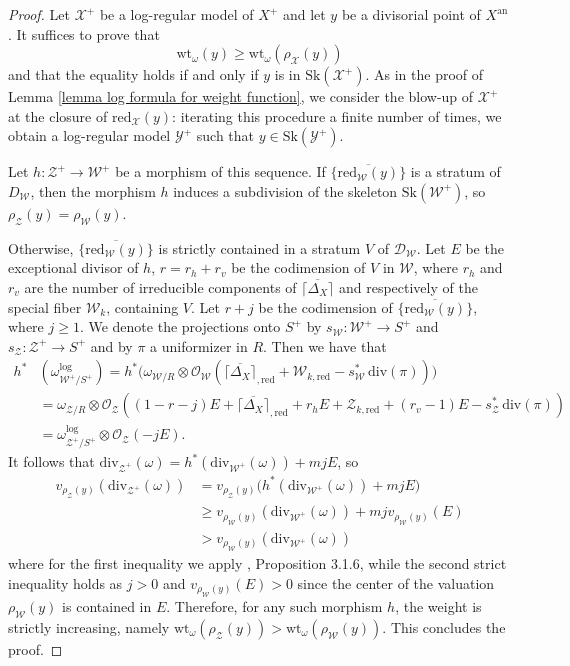 \documentclass{amsart}%
\numberwithin{equation}{subsection}
\theoremstyle{plain2}
\theoremstyle{definition2}
\theoremstyle{stepstyle}
\theoremstyle{point}
\theoremstyle{subpoint}
\newcommand{\D}{{\mathcal D}}
\newcommand{\cX}{\ensuremath{\mathscr{X}}}
\newcommand{\caO}{\ensuremath{\mathcal{O}}}
\newcommand{\cY}{\ensuremath{\mathscr{Y}}}
\newcommand{\cZ}{\ensuremath{\mathscr{Z}}}
\newcommand{\cW}{\ensuremath{\mathscr{W}}}
\renewcommand{\cY}{\ensuremath{\mathscr{Y}}}
\newcommand{\redu}{\mathrm{red}}
\newcommand{\an}{\mathrm{an}}
\newcommand{\divisor}{\mathrm{div}}
\newcommand{\weight}{\mathrm{wt}}
\newcommand{\Sk}{\mathrm{Sk}}
\begin{document}
\begin{proof}
Let $\cX^+$ be a log-regular model of $X^+$ and let $y$ be a divisorial point of $X^\an$. It suffices to prove that $$\weight_{\omega}(y) \geqslant \weight_{\omega}(\rho_\cX(y))$$ and that the equality holds if and only if $y$ is in $\Sk(\cX^+)$. As in the proof of Lemma \ref{lemma log formula for weight function}, we consider the blow-up of $\cX^+$ at the closure of $\redu_{\cX}(y)$: iterating this procedure a finite number of times, we obtain a log-regular model $\cY^+$ such that $y \in \Sk(\cY^+)$.

Let $h: \cZ^+ \rightarrow \cW^+$ be a morphism of this sequence. If $\overline{ \{\redu_{\cW}(y)\}}$ is a stratum of $D_\cW$, then the morphism $h$ induces a subdivision of the skeleton $\Sk(\cW^+)$, so $\rho_\cZ(y)= \rho_{\cW}(y)$.

Otherwise, $\overline{ \{\redu_{\cW}(y)\}}$ is strictly contained in a stratum $V$ of $\D_\cW$. Let $E$ be the exceptional divisor of $h$, $r=r_h +r_v$ be the codimension of $V$ in $\cW$, where $r_h$ and $r_v$ are the number of irreducible components of $\overline{\lceil\Delta_X \rceil}$ and respectively of the special fiber $\cW_k$, containing $V$. Let $r+j$ be the codimension of $\overline{ \{\redu_{\cW}(y)\}}$, where $j \geqslant 1$. We denote the projections onto $S^+$ by $s_{\cW}:\cW^+\rightarrow S^+$ and $s_{\cZ}:\cZ^+ \rightarrow S^+$ and by $\pi$ a uniformizer in $R$. Then we have that
\begin{align*}
h^*&(\omega^{\log}_{\cW^+/S^+}) = h^* \big(\omega_{\cW/R} \otimes \caO_{\cW}(\overline{\lceil\Delta_X \rceil}_{,\redu} + \cW_{k,\redu} - s_\cW^*\, \divisor(\pi)) \big) \\
& = \omega_{\cZ/R}\otimes \caO_{\cZ}((1-r-j)E +\overline{\lceil\Delta_X \rceil}_{,\redu} + r_hE+ \cZ_{k,\redu} + (r_v-1)E - s_\cZ^*\,\divisor(\pi))\\
& = \omega^{\log}_{\cZ^+/S^+} \otimes \caO_{\cZ}(-j E).
\end{align*} It follows that $\divisor_{\cZ^+}(\omega)= h^*(\divisor_{\cW^+}(\omega)) + mjE$, so
\begin{align*}
v_{\rho_\cZ(y)}(\divisor_{\cZ^+}(\omega))& = v_{\rho_\cZ(y)}\big(h^*(\divisor_{\cW^+}(\omega)) + mjE\big)  \\ & \geqslant v_{\rho_\cW(y)}(\divisor_{\cW^+}(\omega)) + mj v_{\rho_\cW(y)}(E) \\ & > v_{\rho_\cW(y)}(\divisor_{\cW^+}(\omega))
\end{align*} where for the first inequality we apply \cite{MustataNicaise}, Proposition 3.1.6, while the second strict inequality holds as $j >0$ and  $v_{\rho_\cW(y)}(E) >0 $ since the center of the valuation $\rho_\cW(y)$ is contained in $E$. Therefore, for any such morphism $h$, the weight is strictly increasing, namely $\weight_{\omega}(\rho_\cZ(y)) > \weight_{\omega} (\rho_\cW(y))$. This concludes the proof.
\end{proof}
\end{document}
